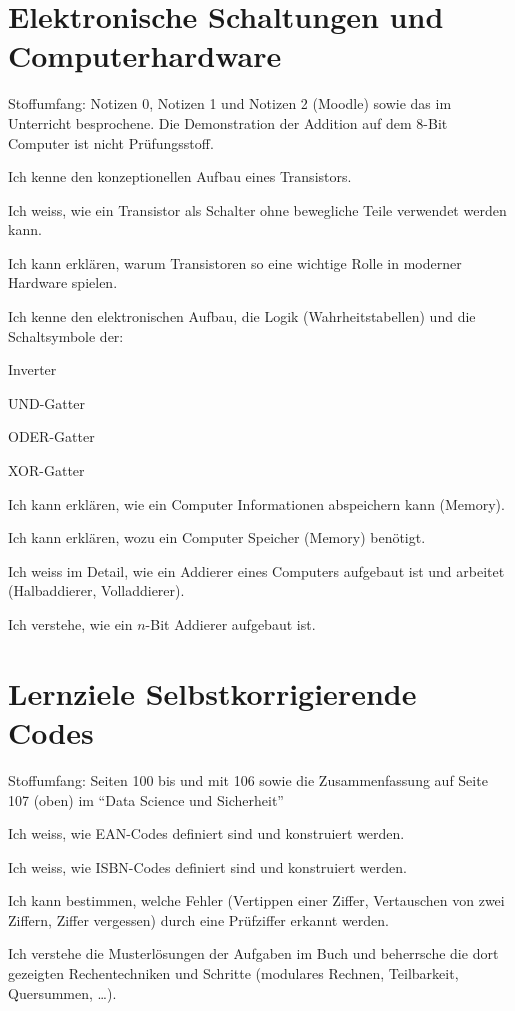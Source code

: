 \section{Elektronische Schaltungen und Computerhardware}
Stoffumfang: Notizen 0, Notizen 1 und Notizen 2 (Moodle) sowie das im Unterricht besprochene.
Die Demonstration der Addition auf dem 8-Bit Computer ist nicht Prüfungsstoff.
\begin{todolist}
\item Ich kenne den konzeptionellen Aufbau eines Transistors.
\item Ich weiss, wie ein Transistor als Schalter ohne bewegliche Teile verwendet werden kann.
\item Ich kann erklären, warum Transistoren so eine wichtige Rolle in moderner Hardware spielen.
\item Ich kenne den elektronischen Aufbau, die Logik (Wahrheitstabellen) und die Schaltsymbole der:
  \begin{todolist}
  \item Inverter
  \item UND-Gatter
  \item ODER-Gatter
  \item XOR-Gatter
  \end{todolist}
\item Ich kann erklären, wie ein Computer Informationen abspeichern kann (Memory).
\item Ich kann erklären, wozu ein Computer Speicher (Memory) benötigt.
\item Ich weiss im Detail, wie ein Addierer eines Computers aufgebaut ist und arbeitet (Halbaddierer, Volladdierer).
\item Ich verstehe, wie ein $n$-Bit Addierer aufgebaut ist.
\end{todolist}

\section*{Lernziele Selbstkorrigierende Codes}
Stoffumfang: Seiten 100 bis und mit 106 sowie die Zusammenfassung auf Seite 107 (oben) im  \enquote{Data Science und Sicherheit}
\begin{todolist}
\item Ich weiss, wie EAN-Codes definiert sind und konstruiert werden.
\item Ich weiss, wie ISBN-Codes definiert sind und konstruiert werden.
\item Ich kann bestimmen, welche Fehler (Vertippen einer Ziffer, Vertauschen von zwei Ziffern, Ziffer vergessen) durch eine Prüfziffer erkannt werden.
\item Ich verstehe die Musterlösungen der Aufgaben im Buch und beherrsche die dort gezeigten Rechentechniken und Schritte (modulares Rechnen, Teilbarkeit, Quersummen, \ldots).
\end{todolist}
